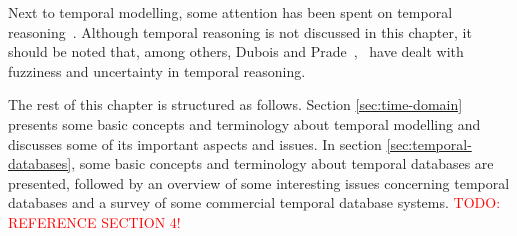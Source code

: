 Next to temporal modelling, some attention has been spent on temporal reasoning~\cite{Allen83}. Although temporal reasoning is not discussed in this chapter, it should be noted that, among others, Dubois and Prade~\cite{Dubois:jucs_9_9:fuzziness_and_uncertainty_in},~\cite{Dubois89} have dealt with fuzziness and uncertainty in temporal reasoning.

The rest of this chapter is structured as follows. Section \ref{sec:time-domain} presents some basic concepts and terminology about temporal modelling and discusses some of its important aspects and issues. In section \ref{sec:temporal-databases}, some basic concepts and terminology about temporal databases are presented, followed by an overview of some interesting issues concerning temporal databases and a survey of some commercial temporal database systems. \textcolor{red}{TODO: REFERENCE SECTION 4!}




